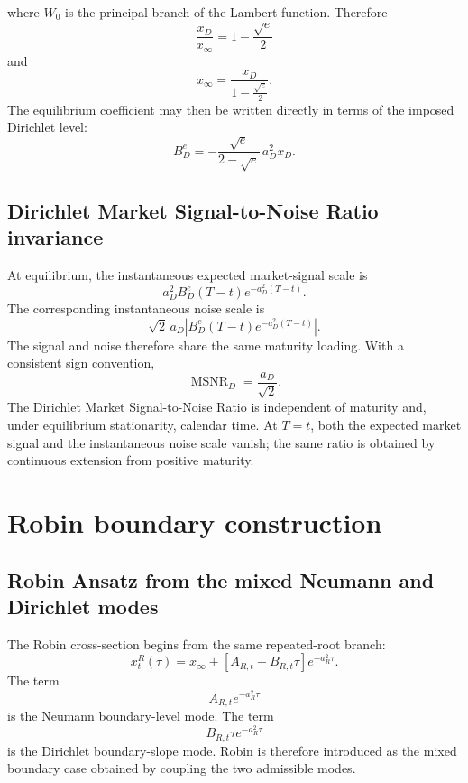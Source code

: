 \documentclass[12pt]{article}
\numberwithin{equation}{subsection}
\newcommand{\MSNR}{\operatorname{MSNR}}
\begin{document}
where $W_0$ is the principal branch of the Lambert function.
Therefore
\begin{equation}
\boxed{\frac{x_D}{x_\infty}=1-\frac{\sqrt e}{2}}
\end{equation}
and
\begin{equation}
x_\infty=\frac{x_D}{1-\frac{\sqrt e}{2}}.
\end{equation}
The equilibrium coefficient may then be written directly in terms of the imposed Dirichlet level:
\begin{equation}
B_D^e
=
-\frac{\sqrt e}{2-\sqrt e}\,a_D^2x_D.
\end{equation}

\subsection{Dirichlet Market Signal-to-Noise Ratio invariance}

At equilibrium, the instantaneous expected market-signal scale is
\begin{equation}
a_D^2B_D^e(T-t)e^{-a_D^2(T-t)}.
\end{equation}
The corresponding instantaneous noise scale is
\begin{equation}
\sqrt2\,a_D
\left|B_D^e(T-t)e^{-a_D^2(T-t)}\right|.
\end{equation}
The signal and noise therefore share the same maturity loading. With a consistent sign convention,
\begin{equation}
\boxed{\MSNR_D=\frac{a_D}{\sqrt2}.}
\end{equation}
The Dirichlet Market Signal-to-Noise Ratio is independent of maturity and, under equilibrium stationarity, calendar time. At $T=t$, both the expected market signal and the instantaneous noise scale vanish; the same ratio is obtained by continuous extension from positive maturity.


\section{Robin boundary construction}

\subsection{Robin Ansatz from the mixed Neumann and Dirichlet modes}

The Robin cross-section begins from the same repeated-root branch:
\begin{equation}
\boxed{x^R_t(\tau)
=
x_\infty+
\left[A_{R,t}+B_{R,t}\tau\right]e^{-a_R^2\tau}.}
\end{equation}
The term
\begin{equation}
A_{R,t}e^{-a_R^2\tau}
\end{equation}
is the Neumann boundary-level mode. The term
\begin{equation}
B_{R,t}\tau e^{-a_R^2\tau}
\end{equation}
is the Dirichlet boundary-slope mode. Robin is therefore introduced as the mixed boundary case obtained by coupling the two admissible modes.
\end{document}
